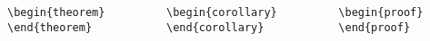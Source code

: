 \begin{columns}
    \begin{column}{.3\textwidth}
        \begin{verbatim}
\begin{theorem}
\end{theorem}
\end{verbatim}
    \end{column}
    \begin{column}{.35\textwidth}
        \begin{verbatim}
\begin{corollary}
\end{corollary}
\end{verbatim}
    \end{column}
    \begin{column}{.3\textwidth}
        \begin{verbatim}
\begin{proof}
\end{proof}
        \end{verbatim}
    \end{column}
\end{columns}